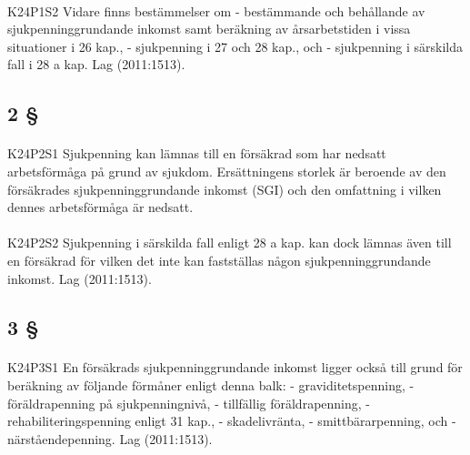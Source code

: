 \documentclass[a4paper,notitlepage,openany,10pt]{book}
\begin{document}
\paragraph*{}
{\tiny K24P1S2}
Vidare finns bestämmelser om
\newline - bestämmande och behållande av sjukpenninggrundande inkomst samt beräkning av årsarbetstiden i vissa situationer i 26 kap.,
\newline - sjukpenning i 27 och 28 kap., och
\newline - sjukpenning i särskilda fall i 28 a kap.
Lag (2011:1513).
\subsection*{2 §}
\paragraph*{}
{\tiny K24P2S1}
Sjukpenning kan lämnas till en försäkrad som har nedsatt arbetsförmåga på grund av sjukdom. Ersättningens storlek är beroende av den försäkrades sjukpenninggrundande inkomst (SGI) och den omfattning i vilken dennes arbetsförmåga är nedsatt.
\paragraph*{}
{\tiny K24P2S2}
Sjukpenning i särskilda fall enligt 28 a kap. kan dock lämnas även till en försäkrad för vilken det inte kan fastställas någon sjukpenninggrundande inkomst.
Lag (2011:1513).
\subsection*{3 §}
\paragraph*{}
{\tiny K24P3S1}
En försäkrads sjukpenninggrundande inkomst ligger också till grund för beräkning av följande förmåner enligt denna balk:
\newline - graviditetspenning,
\newline - föräldrapenning på sjukpenningnivå,
\newline - tillfällig föräldrapenning,
\newline - rehabiliteringspenning enligt 31 kap.,
\newline - skadelivränta,
\newline - smittbärarpenning, och
\newline - närståendepenning.
Lag (2011:1513).
\end{document}
